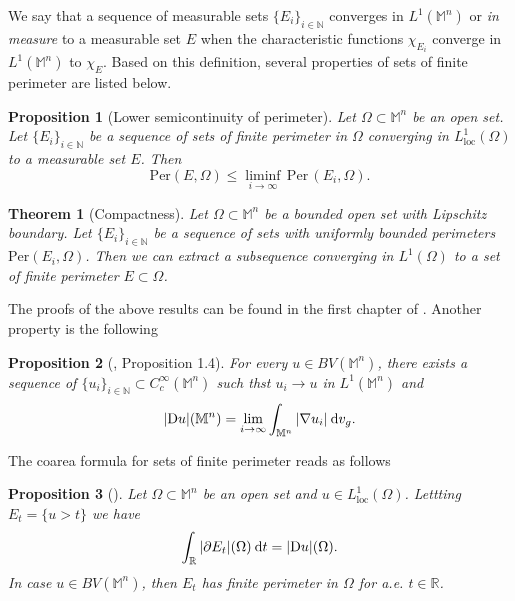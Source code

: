 \documentclass[a4paper,11pt,reqno]{amsart}
\theoremstyle{plain}
\newtheorem{theorem}{Theorem}[section]
\newtheorem{proposition}{Proposition}[section]
\numberwithin{equation}{section} \allowdisplaybreaks
\newcommand{\dvg}{\: {\rm d}v_{g}}
\newcommand{\m}{\mathbb{M}^n}
\newcommand{\dt}{\:{\rm d}t}
\begin{document}
We say that a sequence of measurable sets $\{E_i\}_{i\in \mathbb{N}}$ converges in $L^1(\m)$ or \textit{in measure} to a measurable set $E$  when the characteristic 
functions $\chi_{E_i}$ converge in $L^1(\m)$ to $\chi_E$. Based on this definition, several properties of sets of finite perimeter are listed below.
\begin{proposition}[Lower semicontinuity of perimeter]\label{LS}
    Let $\Omega\subset \m$ be an open set. Let $\{E_i\}_{i\in \mathbb{N}}$ be a sequence of sets of finite perimeter in $\Omega$ converging in $L^1_{\text{loc}}(\Omega)$  to a measurable set $E$. Then
    \begin{equation*}
        \mathrm{Per}(E,\Omega)\leq \liminf_{i\to \infty}\, \mathrm{Per}\,(E_i,\Omega).
    \end{equation*}
\end{proposition}
\begin{theorem}[Compactness]
   Let $\Omega\subset \m$ be a bounded open set with Lipschitz boundary. Let $\{E_i\}_{i\in \mathbb{N}}$ be a sequence of sets with uniformly bounded perimeters $\text{Per}(E_i, \Omega)$. Then we can extract a subsequence converging in $L^1(\Omega)$ to a set of finite perimeter $E\subset \Omega$.
\end{theorem}
The proofs of the above results can be found in the first chapter of \cite{Giusti}. Another property is the following
\begin{proposition}[\cite{MPPP}, Proposition 1.4]\label{approximation}
    For every $u\in BV(\m)$, there exists a sequence of $\{u_i\}_{i\in \mathbb{N}}\subset C_c^{\infty}(\m)$ such thst $u_i\to u$ in $L^1(\m)$ and 
    \begin{equation*}
        |\mathrm{D}u|(\m)= \lim_{ i\to \infty}\int_{\m} |\nabla u_i|\dvg.
    \end{equation*}
\end{proposition}
The coarea formula for sets of finite perimeter reads as follows
\begin{proposition}[\cite{Miranda}]
    Let $\Omega \subset \m$ be an open set and $u\in L^1_{\mathrm{loc}}(\Omega)$. Lettting $E_t=\{u>t\}$ we have
    \begin{equation*}
        \int_{\mathbb{R}}|\partial E_t|(\Omega)\dt= |\mathrm{D}u|(\Omega).
    \end{equation*}
    In case $u\in BV(\m)$, then $E_t$ has finite perimeter in $\Omega$ for a.e. $t\in \mathbb{R}$.
\end{proposition}
\end{document}
